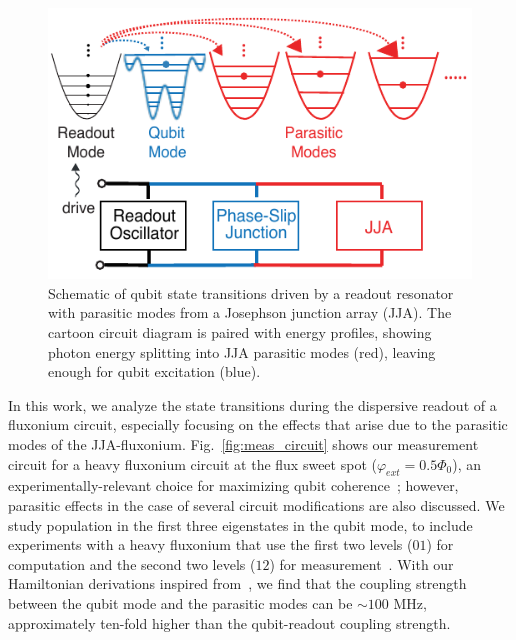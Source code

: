 \documentclass[%
reprint,
superscriptaddress,
 amsmath,amssymb,
 aps,
 prx,
longbibliography,
floatfix,
]{revtex4-2}
\begin{document}


\begin{figure}
    \centering
    \includegraphics[width=\linewidth]{Figures/Demo.pdf}
    \caption{Schematic of qubit state transitions driven by a readout resonator with parasitic modes from a Josephson junction array (JJA). The cartoon circuit diagram is paired with energy profiles, showing photon energy splitting into JJA parasitic modes (red), leaving enough for qubit excitation (blue).}
    \label{fig:demo}
\end{figure}
In this work, we analyze the state transitions during the dispersive readout of a fluxonium circuit, especially focusing on the effects that arise due to the parasitic modes of the JJA-fluxonium. Fig.~\ref{fig:meas_circuit} shows our measurement circuit for a heavy fluxonium circuit at the flux sweet spot  ($\varphi_{ext}=0.5\Phi_0$), an experimentally-relevant choice for maximizing qubit coherence~\cite{somoroff_millisecond_2023,nguyen2019high,zhang_universal_2021,manucharyan2009fluxonium}; however, parasitic effects in the case of several circuit modifications are also discussed. We study population in the first three eigenstates in the qubit mode, to include experiments with a heavy fluxonium that use the first two levels ($01$) for computation and the second two levels ($12$) for measurement~\cite{zhang_universal_2021}. %
With our Hamiltonian derivations inspired from~\cite{viola2015collective}, we find that the coupling strength between the qubit mode and the parasitic modes can be $\sim 100$ MHz, approximately ten-fold higher than the qubit-readout coupling strength. %
\end{document}
